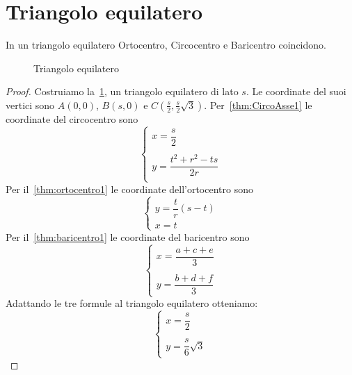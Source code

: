 \section{Triangolo equilatero}\label{sec:triangolo-equilatero}
\begin{thm}\label{thm:triangoloequilatero1}
	In un triangolo equilatero Ortocentro, Circocentro e Baricentro coincidono.
\end{thm}
\begin{figure}
	\centering
	
	\caption{Triangolo equilatero}
	\label{fig:triangoloequilatero1}
\end{figure}
\begin{proof}
	Costruiamo la~\cref{fig:triangoloequilatero1}, un triangolo equilatero di lato $s$. Le coordinate del suoi vertici sono $A(0,0)$, $B(s,0)$ e $C(\frac{s}{2},\frac{s}{2}\sqrt{3})$. 
	Per~\cref{thm:CircoAsse1} le coordinate del circocentro sono
	\[\begin{cases}
		x=\dfrac{s}{2}\\ \\
		y=\dfrac{t^2+r^2-ts}{2r}\\
	\end{cases}\]
	Per il~\cref{thm:ortocentro1} le coordinate dell'ortocentro sono \[\begin{cases}
		y=\dfrac{t}{r}(s-t)\\
		x=t
	\end{cases}\] 
	Per il~\cref{thm:baricentro1} le coordinate del baricentro sono \[\begin{cases}
		x=\dfrac{a+c+e}{3}\\ \\
		y=\dfrac{b+d+f}{3}
	\end{cases} \]
	Adattando le tre formule al triangolo equilatero otteniamo:
	\[\begin{cases}
		x=\dfrac{s}{2}\\ \\
		y=\dfrac{s}{6}\sqrt{3}
	\end{cases}\]
\end{proof}
